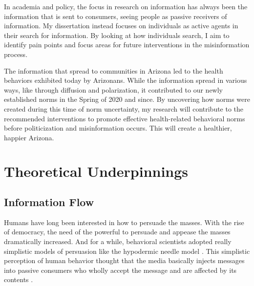 In academia and policy, the focus in research on information has always
been the information that is sent to consumers, seeing people as passive
receivers of information. My dissertation instead focuses on individuals as
active agents in their search for information. By looking at how individuals 
search, I aim to identify pain points and focus areas for future interventions
in the misinformation process.

The information that spread to communities in Arizona led to the health
behaviors exhibited today by Arizonans. While the information spread in various
ways, like through diffusion and polarization, it contributed to our newly
established norms in the Spring of 2020 and since. By uncovering how norms were
created during this time of norm uncertainty, my research will contribute to the
recommended interventions to promote effective health-related behavioral norms
before politicization and misinformation occurs. This will create a healthier,
happier Arizona.

\section{Theoretical Underpinnings}

\subsection{Information Flow}
Humans have long been interested in how to persuade the masses. With the 
rise of democracy, the need of the powerful to persuade and appease the
masses dramatically increased. And for a while, behavioral scientists 
adopted really simplistic models of persuasion like the hypodermic needle model
\citep{bineham1988historical}. This simplistic perception of human behavior 
thought that the media basically injects messages into passive consumers
who wholly accept the message and are affected by its contents \citep{lasswellpropaganda}. 

